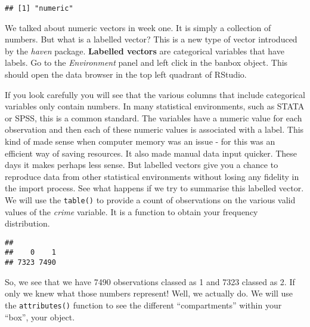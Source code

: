 \documentclass[
]{book}
\newenvironment{Shaded}{\begin{snugshade}}{\end{snugshade}}
\newcommand{\FunctionTok}[1]{\textcolor[rgb]{0.13,0.29,0.53}{\textbf{#1}}}
\newcommand{\NormalTok}[1]{#1}
\newcommand{\SpecialCharTok}[1]{\textcolor[rgb]{0.81,0.36,0.00}{\textbf{#1}}}
\begin{document}
\begin{verbatim}
## [1] "numeric"
\end{verbatim}

We talked about numeric vectors in week one. It is simply a collection of numbers. But what is a labelled vector? This is a new type of vector introduced by the \emph{haven} package. \textbf{Labelled vectors} are categorical variables that have labels. Go to the \emph{Environment} panel and left click in the banbox object. This should open the data browser in the top left quadrant of RStudio.

If you look carefully you will see that the various columns that include categorical variables only contain numbers. In many statistical environments, such as STATA or SPSS, this is a common standard. The variables have a numeric value for each observation and then each of these numeric values is associated with a label. This kind of made sense when computer memory was an issue - for this was an efficient way of saving resources. It also made manual data input quicker. These days it makes perhaps less sense. But labelled vectors give you a chance to reproduce data from other statistical environments without losing any fidelity in the import process. See what happens if we try to summarise this labelled vector. We will use the \texttt{table()} to provide a count of observations on the various valid values of the \emph{crime} variable. It is a function to obtain your frequency distribution.

\begin{Shaded}
\end{Shaded}

\begin{verbatim}
## 
##    0    1 
## 7323 7490
\end{verbatim}

So, we see that we have 7490 observations classed as 1 and 7323 classed as 2. If only we knew what those numbers represent! Well, we actually do. We will use the \texttt{attributes()} function to see the different ``compartments'' within your ``box'', your object.

\begin{Shaded}
\end{Shaded}
\end{document}
